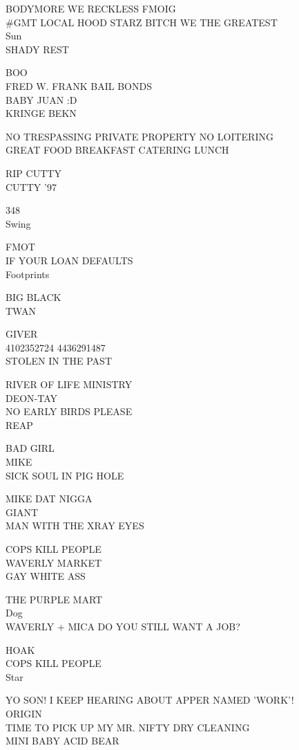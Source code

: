 \documentclass[10pt,letterpaper]{article}
\begin{document}
BODYMORE WE RECKLESS FMOIG\\
\#GMT LOCAL HOOD STARZ BITCH WE THE GREATEST\\
Sun\\
SHADY REST

BOO\\
FRED W. FRANK BAIL BONDS\\
BABY JUAN :D\\
KRINGE BEKN

NO TRESPASSING PRIVATE PROPERTY NO LOITERING\\
GREAT FOOD BREAKFAST CATERING LUNCH

RIP CUTTY\\
CUTTY '97

348\\
Swing

FMOT\\
IF YOUR LOAN DEFAULTS\\
Footprints

BIG BLACK\\
TWAN

GIVER\\
4102352724 4436291487\\
STOLEN IN THE PAST

RIVER OF LIFE MINISTRY\\
DEON{-}TAY\\
NO EARLY BIRDS PLEASE\\
REAP

BAD GIRL\\
MIKE\\
SICK SOUL IN PIG HOLE

MIKE DAT NIGGA\\
GIANT\\
MAN WITH THE XRAY EYES

COPS KILL PEOPLE\\
WAVERLY MARKET\\
GAY WHITE ASS

THE PURPLE MART\\
Dog\\
WAVERLY + MICA DO YOU STILL WANT A JOB?

HOAK\\
COPS KILL PEOPLE\\
Star

YO SON!  I KEEP HEARING ABOUT APPER NAMED 'WORK'!\\
ORIGIN\\
TIME TO PICK UP MY MR. NIFTY DRY CLEANING\\
MINI BABY ACID BEAR
\end{document}
